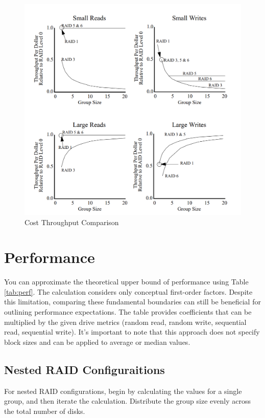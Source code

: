 \documentclass{article}
\begin{document}
\begin{figure}[h]
    \label{fig:costthroughput}
    \includegraphics[width=\textwidth]{cost-troughput-comparison}
    \caption{Cost Throughput Comparison}
\end{figure}
\pagebreak
\section{Performance}
You can approximate the theoretical upper bound of performance using Table \ref{tab:perf}. 
The calculation considers only conceptual first-order factors. Despite this limitation, 
comparing these fundamental boundaries can still be beneficial for outlining performance expectations. 
The table provides coefficients that can be multiplied by the given drive metrics 
(random read, random write, sequential read, sequential write). 
It's important to note that this approach does not specify block sizes and
can be applied to average or median values. \cite{uw:raid}
\subsection{Nested RAID Configuraitions}
For nested RAID configurations, begin by calculating the values for a single group, and then iterate the calculation. Distribute the group size evenly across the total number of disks.
\end{document}
